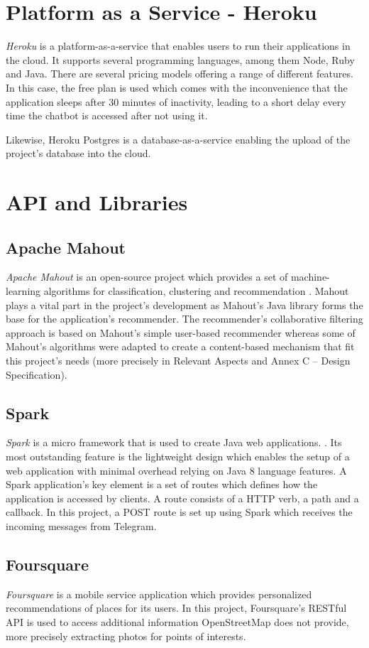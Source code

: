 \section{Platform as a Service - Heroku}
\textit{Heroku} \cite{heroku} is a platform-as-a-service that enables users to run their applications in the cloud. It supports several programming languages, among them Node, Ruby and Java. There are several pricing models offering a range of different features. In this case, the free plan is used which comes with the inconvenience that the application sleeps after 30 minutes of inactivity, leading to a short delay every time the chatbot is accessed after not using it.

Likewise, Heroku Postgres is a database-as-a-service enabling the upload of the project’s database into the cloud. 

\section{API and Libraries}
\subsection{Apache Mahout}
\textit{Apache Mahout} is an open-source project which provides a set of machine-learning algorithms for classification, clustering and recommendation \cite{mahout}. Mahout plays a vital part in the project’s development as Mahout’s Java library forms the base for the application’s recommender. The recommender’s collaborative filtering approach is based on Mahout’s simple user-based recommender \cite{mahout:userbased} whereas some of Mahout’s algorithms were adapted to create a content-based mechanism that fit this project’s needs (more precisely in Relevant Aspects and Annex C – Design Specification).

\subsection{Spark}
\textit{Spark} is a micro framework that is used to create Java web applications. \cite{spark}. Its most outstanding feature is the lightweight design which enables the setup of a web application with minimal overhead relying on Java 8 language features. A Spark application's key element is a set of routes which defines how the application is accessed by clients. A route consists of a HTTP verb, a path and a callback. In this project, a POST route is set up using Spark which receives the incoming messages from Telegram. 

\subsection{Foursquare}
\textit{Foursquare} \cite{foursquare} is a mobile service application which provides personalized recommendations of places for its users. In this project, Foursquare’s RESTful API is used to access additional information OpenStreetMap does not provide, more precisely extracting photos for points of interests.
